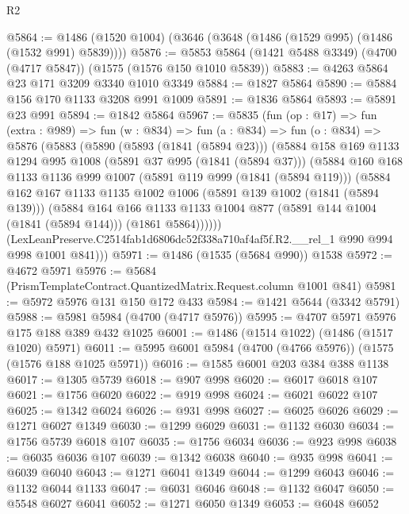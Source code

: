 \begin{lexlean}{R2}
\begin{coremodule}
@5864 := @1486 (@1520 @1004) (@3646 (@3648 (@1486 (@1529 @995) (@1486 (@1532 @991) @5839))))
@5876 := @5853 @5864 (@1421 @5488 @3349) (@4700 (@4717 @5847)) (@1575 (@1576 @150 @1010 @5839))
@5883 := @4263 @5864 @23 @171 @3209 @3340 @1010 @3349
@5884 := @1827 @5864
@5890 := @5884 @156 @170 @1133 @3208 @991 @1009
@5891 := @1836 @5864
@5893 := @5891 @23 @991
@5894 := @1842 @5864
@5967 := @5835
    (fun (op : @17) =>
    fun (extra : @989) =>
    fun (w : @834) =>
    fun (a : @834) =>
    fun (o : @834) =>
    @5876
      (@5883
        (@5890
          (@5893 (@1841 (@5894 @23)))
          (@5884
            @158
            @169
            @1133
            @1294
            @995
            @1008
            (@5891 @37 @995 (@1841 (@5894 @37)))
            (@5884
              @160
              @168
              @1133
              @1136
              @999
              @1007
              (@5891 @119 @999 (@1841 (@5894 @119)))
              (@5884
                @162
                @167
                @1133
                @1135
                @1002
                @1006
                (@5891 @139 @1002 (@1841 (@5894 @139)))
                (@5884
                  @164
                  @166
                  @1133
                  @1133
                  @1004
                  @877
                  (@5891 @144 @1004 (@1841 (@5894 @144)))
                  (@1861 @5864))))))
        (LexLeanPreserve.C2514fab1d6806dc52f338a710af4af5f.R2.__rel_1 @990 @994 @998 @1001 @841)))
@5971 := @1486 (@1535 (@5684 @990)) @1538
@5972 := @4672 @5971
@5976 := @5684 (PrismTemplateContract.QuantizedMatrix.Request.column @1001 @841)
@5981 := @5972 @5976 @131 @150 @172 @433
@5984 := @1421 @5644 (@3342 @5791)
@5988 := @5981 @5984 (@4700 (@4717 @5976))
@5995 := @4707 @5971 @5976 @175 @188 @389 @432 @1025
@6001 := @1486 (@1514 @1022) (@1486 (@1517 @1020) @5971)
@6011 := @5995 @6001 @5984 (@4700 (@4766 @5976)) (@1575 (@1576 @188 @1025 @5971))
@6016 := @1585 @6001 @203 @384 @388 @1138
@6017 := @1305 @5739
@6018 := @907 @998
@6020 := @6017 @6018 @107
@6021 := @1756 @6020
@6022 := @919 @998
@6024 := @6021 @6022 @107
@6025 := @1342 @6024
@6026 := @931 @998
@6027 := @6025 @6026
@6029 := @1271 @6027 @1349
@6030 := @1299 @6029
@6031 := @1132 @6030
@6034 := @1756 @5739 @6018 @107
@6035 := @1756 @6034
@6036 := @923 @998
@6038 := @6035 @6036 @107
@6039 := @1342 @6038
@6040 := @935 @998
@6041 := @6039 @6040
@6043 := @1271 @6041 @1349
@6044 := @1299 @6043
@6046 := @1132 @6044 @1133
@6047 := @6031 @6046
@6048 := @1132 @6047
@6050 := @5548 @6027 @6041
@6052 := @1271 @6050 @1349
@6053 := @6048 @6052

\end{coremodule}
\end{lexlean}
